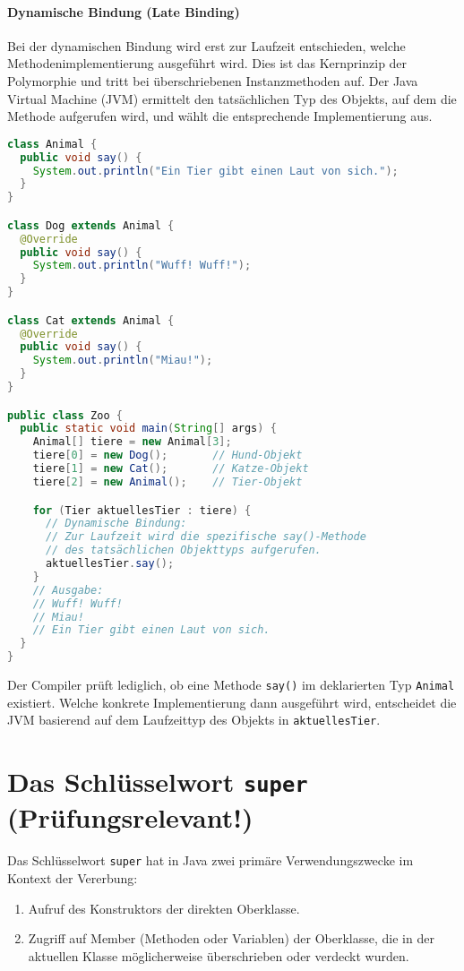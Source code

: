 \paragraph{Dynamische Bindung (Late Binding)}
Bei der dynamischen Bindung wird erst zur Laufzeit entschieden, welche Methodenimplementierung ausgeführt wird. Dies ist 
das Kernprinzip der Polymorphie und tritt bei überschriebenen Instanzmethoden auf. Der Java Virtual Machine (JVM) ermittelt 
den tatsächlichen Typ des Objekts, auf dem die Methode aufgerufen wird, und wählt die entsprechende Implementierung aus.

\begin{lstlisting}[language=Java, caption={Beispiel für dynamische Bindung}]
class Animal {
  public void say() {
    System.out.println("Ein Tier gibt einen Laut von sich.");
  }
}

class Dog extends Animal {
  @Override
  public void say() {
    System.out.println("Wuff! Wuff!");
  }
}

class Cat extends Animal {
  @Override
  public void say() {
    System.out.println("Miau!");
  }
}

public class Zoo {
  public static void main(String[] args) {
    Animal[] tiere = new Animal[3];
    tiere[0] = new Dog();       // Hund-Objekt
    tiere[1] = new Cat();       // Katze-Objekt
    tiere[2] = new Animal();    // Tier-Objekt

    for (Tier aktuellesTier : tiere) {
      // Dynamische Bindung:
      // Zur Laufzeit wird die spezifische say()-Methode
      // des tatsächlichen Objekttyps aufgerufen.
      aktuellesTier.say();
    }
    // Ausgabe:
    // Wuff! Wuff!
    // Miau!
    // Ein Tier gibt einen Laut von sich.
  }
}
\end{lstlisting}
Der Compiler prüft lediglich, ob eine Methode \texttt{say()} im deklarierten Typ \texttt{Animal} existiert. Welche konkrete 
Implementierung dann ausgeführt wird, entscheidet die JVM basierend auf dem Laufzeittyp des Objekts in \texttt{aktuellesTier}.

\section{Das Schlüsselwort \texttt{super} (Prüfungsrelevant!)}
\label{sec:super}

Das Schlüsselwort \texttt{super} hat in Java zwei primäre Verwendungszwecke im Kontext der Vererbung:
\begin{enumerate}
    \item Aufruf des Konstruktors der direkten Oberklasse.
    \item Zugriff auf Member (Methoden oder Variablen) der Oberklasse, die in der aktuellen Klasse möglicherweise überschrieben oder verdeckt wurden.
\end{enumerate}

